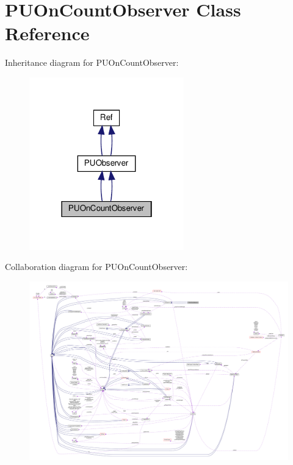 \hypertarget{classPUOnCountObserver}{}\section{P\+U\+On\+Count\+Observer Class Reference}
\label{classPUOnCountObserver}


Inheritance diagram for P\+U\+On\+Count\+Observer\+:
\nopagebreak
\begin{figure}[H]
\begin{center}
\leavevmode
\includegraphics[width=190pt]{classPUOnCountObserver__inherit__graph}
\end{center}
\end{figure}


Collaboration diagram for P\+U\+On\+Count\+Observer\+:
\nopagebreak
\begin{figure}[H]
\begin{center}
\leavevmode
\includegraphics[width=350pt]{classPUOnCountObserver__coll__graph}
\end{center}
\end{figure}
